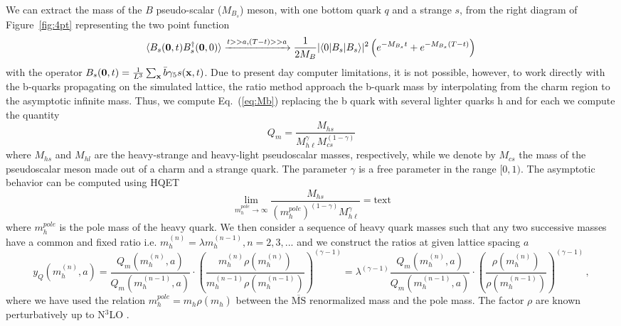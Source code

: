 We can extract the mass of the $B$ pseudo-scalar ($M_{B_s}$) meson, with one bottom quark $q$
and a strange $s$,
from the right diagram of Figure~\ref{fig:4pt} representing the two point function
\begin{equation}
  \langle B_s(\bm{0},t) B_s^\dagger({\bf 0},0)\rangle\xrightarrow{t>>a, (T-t)>>a}
  \frac{1}{2M_B}|\langle 0 | B_s | B_s\rangle|^2\left(e^{-M_{B_s} t}+e^{-M_{B_s}(T-t)}\right)
  \, \label{eq:Mb}
\end{equation}
with the operator $B_s({\bf 0},t)=\frac{1}{L^3}\sum_{\bf x}\bar b\gamma_5 s({\bf x},t)$.
Due to present day computer limitations, it is not possible, however, to work directly
with the b-quarks propagating on the simulated lattice, the ratio method approach the
b-quark mass by interpolating from the charm region to the asymptotic infinite mass.
Thus, we compute Eq.~(\ref{eq:Mb}) replacing the b quark with several lighter quarks h
and for each we compute the quantity
\begin{equation}
  Q_m = \frac{M_{hs}}{M_{h\ell}^\gamma M_{cs}^{(1-\gamma)}}
  \label{eq:ratio_Q}
\end{equation}
where $M_{hs}$ and $M_{hl}$ are the heavy-strange and heavy-light
pseudoscalar masses, respectively, while we denote by $M_{cs}$
the mass of the pseudoscalar meson made out of a charm
and a strange quark. The parameter $\gamma$ is a free parameter in the range  $[0, 1)$.
The asymptotic behavior can be computed using HQET
\begin{equation}
  \lim_{ m^{pole}_h\to \infty}
  \frac{M_{hs}}{( m^{pole}_h)^{(1-\gamma)} M_{h\ell}^\gamma}=\mbox{text}
  \label{eq:yHQFTlim}
\end{equation}
where $ m^{pole}_h$ is the pole mass of the heavy quark.
We then consider a sequence of heavy quark masses such that any two
successive masses have a common and fixed ratio i.e.
$ m_h^{(n)}=\lambda m_h^{(n-1)}, n=2,3,...$ and we construct the ratios
at given lattice spacing $a$
\begin{equation}
  y_Q( m^{(n)}_h,a)=\frac{Q_m( m_h^{(n)},a)}{Q_m( m_h^{(n-1)},a)}\cdot
  \left(\frac{ m_{h}^{(n)} \rho( m_{h}^{(n)})}{ m_{h}^{(n-1)}\rho( m_{h}^{(n-1)})}\right)^{(\gamma-1)}
  =\lambda^{(\gamma-1)}\frac{Q_m( m_h^{(n)},a)}{Q_m( m_h^{(n-1)},a)}\cdot
  \left(\frac{ \rho( m_{h}^{(n)})}{\rho( m_{h}^{(n-1)})}\right)^{(\gamma-1)}\,,
\end{equation}
where we have used the relation  $ m^{pole}_h= m_{h}^{} \rho( m_{h}^{})$
between the $\overline{\mbox{MS}}$ renormalized mass and the pole mass.
The factor $\rho$ are known perturbatively up to N$^3$LO \cite{Chetyrkin:1999pq}.
